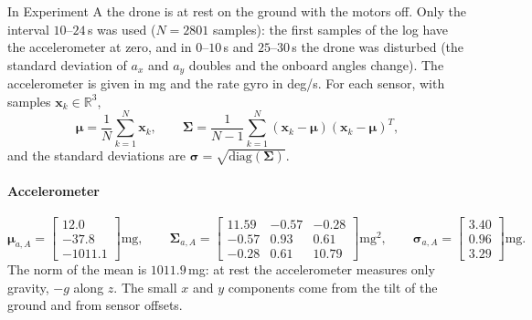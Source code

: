\documentclass[10pt,a4paper]{article}
\newenvironment{answer}{%
  \begin{tcolorbox}[breakable,enhanced,colback=white,colframe=greyline,
    boxrule=0.6pt,arc=2pt,left=8pt,right=8pt,top=7pt,bottom=7pt,
    before skip=0pt,after skip=12pt]
}{\end{tcolorbox}}
\newcommand{\R}{\mathbb{R}}
\begin{document}
\begin{answer}
In Experiment A the drone is at rest on the ground with the motors off.
Only the interval $10$--$24$\,s was used ($N=2801$ samples): the first
samples of the log have the accelerometer at zero, and in $0$--$10$\,s and
$25$--$30$\,s the drone was disturbed (the standard deviation of $a_x$ and
$a_y$ doubles and the onboard angles change). The accelerometer is given in mg
and the rate gyro in deg/s. For each sensor, with samples
$\mathbf{x}_k\in\R^3$,
\[
  \boldsymbol{\mu} = \frac{1}{N}\sum_{k=1}^{N}\mathbf{x}_k, \qquad
  \boldsymbol{\Sigma} = \frac{1}{N-1}\sum_{k=1}^{N}
  (\mathbf{x}_k-\boldsymbol{\mu})(\mathbf{x}_k-\boldsymbol{\mu})^T,
\]
and the standard deviations are $\boldsymbol{\sigma}=\sqrt{\mathrm{diag}(\boldsymbol{\Sigma})}$.

\paragraph{Accelerometer}
\[
\boldsymbol{\mu}_{a,A} =
\begin{bmatrix} 12.0\\ -37.8\\ -1011.1 \end{bmatrix}\mathrm{mg},
\qquad
\boldsymbol{\Sigma}_{a,A} =
\begin{bmatrix}
11.59 & -0.57 & -0.28\\
-0.57 & 0.93 & 0.61\\
-0.28 & 0.61 & 10.79
\end{bmatrix}\mathrm{mg}^2,
\qquad
\boldsymbol{\sigma}_{a,A} =
\begin{bmatrix} 3.40\\ 0.96\\ 3.29 \end{bmatrix}\mathrm{mg}.
\]
The norm of the mean is $1011.9$\,mg: at rest the accelerometer
measures only gravity, $-g$ along $z$. The small $x$ and $y$ components
come from the tilt of the ground and from sensor offsets.


\end{answer}
\end{document}
